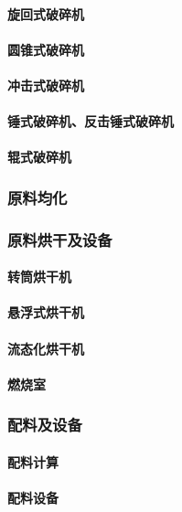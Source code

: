 \documentclass[UTF8]{../../ApplicationUniverse}
\begin{document}
            \paragraph{旋回式破碎机}
            \paragraph{圆锥式破碎机}
            \paragraph{冲击式破碎机}
            \paragraph{锤式破碎机、反击锤式破碎机}
            \paragraph{辊式破碎机}
        \subsubsection{原料均化}
        \subsubsection{原料烘干及设备}
            \paragraph{转筒烘干机}
            \paragraph{悬浮式烘干机}
            \paragraph{流态化烘干机}
            \paragraph{燃烧室}
        \subsubsection{配料及设备}
            \paragraph{配料计算}
            \paragraph{配料设备}
\end{document}

